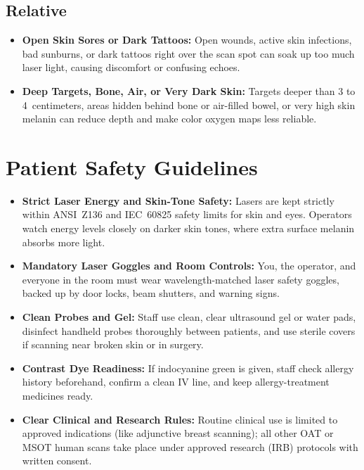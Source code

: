 \subsection{Relative}
\begin{itemize}
  \item \textbf{Open Skin Sores or Dark Tattoos:} Open wounds, active skin infections, bad sunburns, or dark tattoos right over the scan spot can soak up too much laser light, causing discomfort or confusing echoes.
  \item \textbf{Deep Targets, Bone, Air, or Very Dark Skin:} Targets deeper than 3 to 4~centimeters, areas hidden behind bone or air-filled bowel, or very high skin melanin can reduce depth and make color oxygen maps less reliable.
\end{itemize}

\section{Patient Safety Guidelines}
\begin{itemize}
  \item \textbf{Strict Laser Energy and Skin-Tone Safety:} Lasers are kept strictly within ANSI~Z136 and IEC~60825 safety limits for skin and eyes. Operators watch energy levels closely on darker skin tones, where extra surface melanin absorbs more light.
  \item \textbf{Mandatory Laser Goggles and Room Controls:} You, the operator, and everyone in the room must wear wavelength-matched laser safety goggles, backed up by door locks, beam shutters, and warning signs.
  \item \textbf{Clean Probes and Gel:} Staff use clean, clear ultrasound gel or water pads, disinfect handheld probes thoroughly between patients, and use sterile covers if scanning near broken skin or in surgery.
  \item \textbf{Contrast Dye Readiness:} If indocyanine green is given, staff check allergy history beforehand, confirm a clean IV line, and keep allergy-treatment medicines ready.
  \item \textbf{Clear Clinical and Research Rules:} Routine clinical use is limited to approved indications (like adjunctive breast scanning); all other OAT or MSOT human scans take place under approved research (IRB) protocols with written consent.
\end{itemize}

